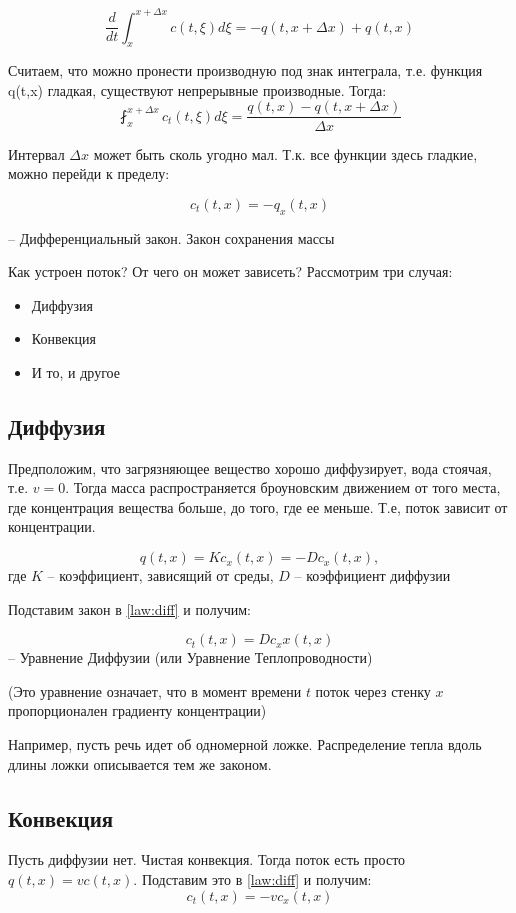 \documentclass[12pt]{report}
\begin{document}
$$\frac{d}{dt} \int^{x + \Delta x}_{x}{c(t, \xi)d\xi} = -q(t, x + \Delta x) + q(t, x)$$

Считаем, что можно пронести производную под знак интеграла, т.е. функция q(t,x) гладкая, существуют непрерывные производные. Тогда: 
$$
    \fint_{x}^{x + \Delta x}{c_t(t, \xi)d\xi} = \frac{q(t,x) - q(t, x+ \Delta x)}{\Delta x}
$$

Интервал $\Delta x$ может быть сколь угодно мал. Т.к. все функции здесь гладкие, можно перейди к пределу: 

\begin{equation} \label {law:diff}
    c_t(t, x) = - q_x(t,x)    
\end{equation}

    -- Дифференциальный закон. Закон сохранения массы

Как устроен поток? От чего он может зависеть? Рассмотрим три случая:
\begin{itemize}
    \item Диффузия
    \item Конвекция
    \item И то, и другое
\end{itemize}

\subsection{Диффузия}

Предположим, что загрязняющее вещество хорошо диффузирует, вода стоячая, т.е. $v=0$. Тогда масса распространяется броуновским движением от того места, где концентрация вещества больше, до того, где ее меньше. 
Т.е, поток зависит от концентрации.

$$q(t,x) = Kc_x(t,x) = -Dc_x(t,x),$$
где $K$ -- коэффициент, зависящий от среды, $D$ -- коэффициент диффузии

Подставим закон в \eqref{law:diff} и получим: 

\begin{equation} \label{eq:diffusion}
    c_t(t,x) = Dc_xx(t,x)
\end{equation}
    -- Уравнение Диффузии (или Уравнение Теплопроводности)
    
(Это уравнение означает, что в момент времени $t$ поток через стенку $x$ пропорционален градиенту концентрации)
    
Например, пусть речь идет об одномерной ложке. Распределение тепла вдоль длины ложки описывается тем же законом.

\subsection{Конвекция}
Пусть диффузии нет. Чистая конвекция. Тогда поток есть просто $q(t,x) = vc(t,x)$.
Подставим это в \eqref{law:diff} и получим: 
$$c_t(t,x) = -vc_x(t,x)$$
\end{document}
